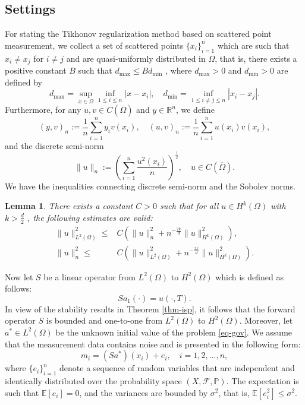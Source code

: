 \documentclass[11pt]{article}
\newtheorem{lemma}{Lemma}[section]
\numberwithin{equation}{section}
\begin{document}
\subsection{Settings}
For stating the Tikhonov regularization method based on scattered point measurement, we collect a set of  scattered points $ \{ x_i \}_{i = 1}^n$ which are such that $ x_i \neq x_j $ for $ i \neq j $ and are quasi-uniformly distributed in $ \Omega $, that is, there exists a positive constant $ B $ such that $ d_{\max} \le B d_{\min} $ , where $ d_{\max}>0$ and $ d_{\min}>0$ are defined by
$$
d_{\max} = \sup_{x \in \Omega} \inf_{1 \leq i \leq n} | x - x_i |,\quad
d_{\min} = \inf_{1 \leq i \neq j \leq n} | x_i - x_j | .
$$
Furthermore, for any $u,v\in C(\overline\Omega)$ and $y\in\mathbb R^n$, we define
$$
(y,v)_n := \frac1n \sum_{i=1}^n y_i v(x_i),\quad (u,v)_n:=\frac1n \sum_{i=1}^n u(x_i)v(x_i),
$$
and the discrete semi-norm
$$
\|u\|_n := \left(\sum_{i=1}^n \frac{u^2(x_i)}{n} \right)^{\frac12},\quad u\in C(\overline \Omega).
$$
We have the inequalities connecting discrete semi-norm and the Sobolev norms.
\begin{lemma}\cite[Theorems 3.3 and 3.4]{utreras1988convergence}
\label{lem-u-un}
There exists a constant  $C>0$  such that for all  $  u \in H^k(\Omega)$ with $k>\frac{d}2$ , the following estimates are valid:
\begin{equation}\label{esti-u<un}
\begin{aligned}
\| u \|^2_{L^2(\Omega)} \leq& C \left( \| u \|^2_n + n^{-\frac{2k}{d}} \| u \|^2_{H^k(\Omega)} \right),\\
\| u \|^2_n \leq& C \left( \| u \|^2_{L^2(\Omega)} + n^{-\frac{2k}{d}} \| u \|^2_{H^k(\Omega)} \right).
\end{aligned}
\end{equation}
\end{lemma}
Now let $S$ be a linear operator from $L^2(\Omega)$ to $H^2(\Omega)$ which is defined as follows:
$$
Sa_1(\cdot) = u(\cdot,T).
$$
In view of the stability results in Theorem \ref{thm-isp}, it follows that the forward operator $S$ is bounded and one-to-one from $L^2(\Omega)$ to $H^2(\Omega)$. Moreover, let $a^*\in L^2(\Omega) $ be the unknown initial value of the problem \eqref{eq-gov}. We assume that the measurement data contains noise and is presented in the following form:
\begin{equation}\label{ob-noise0}
m_i = (Sa^*)(x_i) + e_i, \quad i = 1,2,...,n,
\end{equation}
where $\{e_i\}_{i=1}^n$ denote a sequence of random variables that are independent and identically distributed over the probability space $(X, \mathscr{F}, \mathbb{P})$. The expectation is such that $\mathbb{E}[e_i] = 0$, and the variances are bounded by $\sigma^2$, that is, $\mathbb{E}[e_i^2] \leq \sigma^2$.
\end{document}
